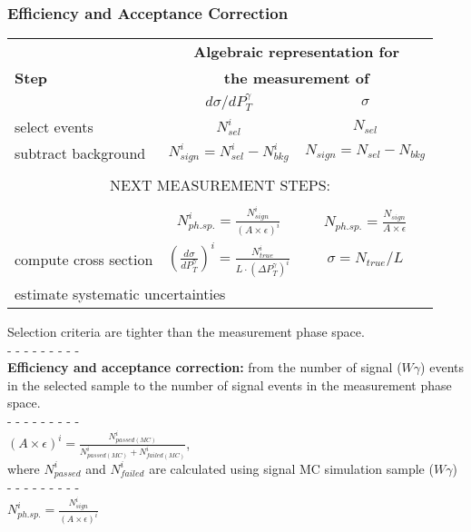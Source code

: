 \begin{frame}\frametitle{Efficiency and Acceptance Correction}

\begin{table}[h]
  \tiny
  \begin{center}
  \begin{tabular}{|l|c|c|}
    \hline
          & \multicolumn{2}{|c|}{{\bfseries{Algebraic representation for}}} \\ 
     {\bfseries{Step}} & \multicolumn{2}{|c|}{{\bfseries{the measurement of}}} \\ 
          & {\bfseries{$d\sigma/dP_{T}^{\gamma}$}} & {\bfseries{$\sigma$}} \\ \hline
    select events & {\bfseries{$N_{sel}^i$}} &    {\bfseries{$N_{sel}$}}       \\ \hline
    subtract background & {\bfseries{$N_{sign}^i = N_{sel}^i - N_{bkg}^i$}} &    {\bfseries{$N_{sign}=N_{sel}-N_{bkg}$}}       \\ \hline
    \multicolumn{3}{|c|}{ } \\  
    \multicolumn{3}{|c|}{NEXT MEASUREMENT STEPS:} \\  
    \multicolumn{3}{|c|}{ } \\ \hline 
    {\bfseries\color{blue}{correct for eff X acc}} & {\color{blue}$N_{ph.sp.}^i = \frac{N_{sign}^i}{(A \times\epsilon)^i}$} &  {\color{blue}$N_{ph.sp.}=\frac{N_{sign}}{A\times\epsilon}$}       \\ \hline
    compute cross section & $ \left( \frac{d\sigma}{dP_{T}^\gamma} \right) ^i = \frac{N_{true}^i}{L \cdot (\Delta P_T^\gamma)^i}$  &  $\sigma = N_{true}/L$       \\ \hline
    \multicolumn{3}{|l|}{estimate systematic uncertainties }         \\ \hline
  \end{tabular}
  \label{tab:analysisOutline}
  \end{center}
\end{table}

\scriptsize
Selection criteria are tighter than the measurement phase space. \\
\tiny
- - - - - - - - - \\
{\bfseries{Efficiency and acceptance correction:}} from the number of signal ($W\gamma$) events in the selected sample to the number of signal events in the measurement phase space.\\
- - - - - - - - - \\
\scriptsize
$(A\times\epsilon)^i = \frac{N_{passed(MC)}^i}{N_{passed(MC)}^i+N_{failed(MC)}^i}$, \\
{\tiny where {$N_{passed}^i$ and $N_{failed}^i$ are calculated using signal MC simulation sample ($W\gamma$)}}\\
- - - - - - - - - \\
$N_{ph.sp.}^i = \frac{N_{sign}^i}{(A \times\epsilon)^i}$

\end{frame}%

